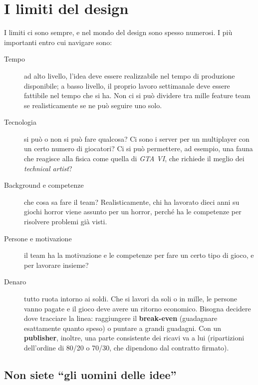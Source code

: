 \section{I limiti del design}
\label{sec:limiti}



I limiti ci sono sempre, e nel mondo del design sono spesso numerosi. I più
importanti entro cui navigare sono:
\begin{description}
  \item[Tempo] ad alto livello, l'idea deve essere realizzabile nel tempo di
        produzione disponibile; a basso livello, il proprio lavoro
        settimanale deve essere fattibile nel tempo che si ha. Non ci si può
        dividere tra mille feature team se realisticamente se ne può seguire
        uno solo.
  \item[Tecnologia] si può o non si può fare qualcosa? Ci sono i server per un
        multiplayer con un certo numero di giocatori? Ci si può permettere,
        ad esempio, una fauna che reagisce alla fisica come quella di
        \emph{GTA VI}, che richiede il meglio dei \emph{technical artist}?
  \item[Background e competenze] che cosa sa fare il team? Realisticamente,
        chi ha lavorato dieci anni su giochi horror viene assunto per un
        horror, perché ha le competenze per risolvere problemi già visti.
  \item[Persone e motivazione] il team ha la motivazione e le competenze per
        fare un certo tipo di gioco, e per lavorare insieme?
  \item[Denaro] tutto ruota intorno ai soldi. Che si lavori da soli o in mille,
        le persone vanno pagate e il gioco deve avere un ritorno economico.
        Bisogna decidere dove tracciare la linea: raggiungere il
        \textbf{break-even} (guadagnare esattamente quanto speso) o puntare a
        grandi guadagni. Con un \textbf{publisher}, inoltre, una parte
        consistente dei ricavi va a lui (ripartizioni dell'ordine di 80/20 o
        70/30, che dipendono dal contratto firmato).
\end{description}

\subsection{Non siete ``gli uomini delle idee''}

